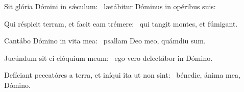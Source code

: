 \item Sit glória Dómini in sǽculum:~\psstar{} lætábitur Dóminus in opéribus suis:

\item Qui réspicit terram, et facit eam trémere:~\psstar{} qui tangit montes, et fúmigant.

\item Cantábo Dómino in vita mea:~\psstar{} psallam Deo meo, quámdiu sum.

\item Jucúndum sit ei elóquium meum:~\psstar{} ego vero delectábor in Dómino.

\item Defíciant peccatóres a terra, et iníqui ita ut non sint:~\psstar{} bénedic, ánima mea, Dómino.
